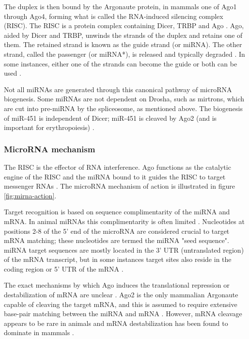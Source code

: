 The duplex is then bound by the Argonaute protein, in mammals one of Ago1
through Ago4, forming what is called the RNA-induced silencing complex (RISC).
The RISC is a protein complex containing Dicer, TRBP and Ago \citep{Gregory2005}.
Ago, aided by Dicer and TRBP, unwinds the strands of the duplex and retains one of
them. The retained strand is known as the guide strand (or miRNA). The other
strand, called the passenger (or miRNA*), is released and typically degraded \citep{Du2005}.
In some instances, either one of the strands can become the guide
or both can be used \citep{Czech2009}.

Not all miRNAs are generated through this canonical pathway of microRNA
biogenesis. Some miRNAs are not dependent on Drosha, such as mirtrons, which
are cut into pre-miRNA by the spliceosome, as mentioned above. The biogenesis of
miR-451 is independent of Dicer; miR-451 is cleaved by Ago2 (and is
important for erythropoiesis) \citep{Cheloufi2010}.






\subsubsection{MicroRNA mechanism}\label{microrna-mechanism}

The RISC is the effector of RNA interference. Ago functions as the catalytic
engine of the RISC and the miRNA bound to it guides the RISC to target
messenger RNAs \citep{Filipowicz2008}. The microRNA mechanism of action is
illustrated in figure \ref{fig:mirna-action}.

Target recognition is based on sequence complimentarity of the miRNA and mRNA.
In animal miRNAs this complimentarity is often limited \citep{Ambros2004}.
Nucleotides at positions 2-8 of the 5' end of the microRNA are considered
crucial to target mRNA matching; these nucleotides are termed the miRNA "seed sequence".
miRNA target sequences are mostly located in the 3' UTR (untranslated region)
of the mRNA transcript, but in some instances target sites also reside in the
coding region or 5' UTR of the mRNA \citep{Bartel2009}.

The exact mechanisms by which Ago induces the translational repression or
destabilization of mRNA are unclear \citep{Filipowicz2008}. Ago2 is the only mammalian
Argonaute capable of cleaving the target mRNA, and this is assumed to require
extensive base-pair matching between the miRNA and mRNA \citep{Du2005}. However,
mRNA cleavage appears to be rare in animals and mRNA destabilization
has been found to dominate in mammals \citep{Guo2010}.

